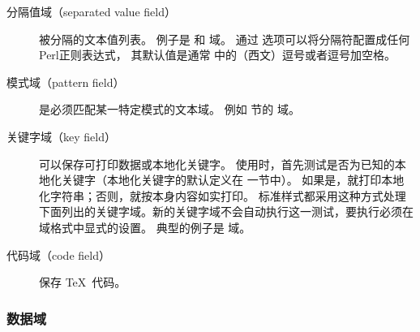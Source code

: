 \begin{description}
\begin{description}
\item[分隔值域（separated value field）]
被分隔的文本值列表。
例子是  和  域。
通过  选项可以将分隔符配置成任何Perl正则表达式，
其默认值是通常 \BibTeX 中的（西文）逗号或者逗号加空格。


\item[模式域（pattern field）] 是必须匹配某一特定模式的文本域。
例如  节的  域。



\item[关键字域（key field）] 可以保存可打印数据或本地化关键字。
使用时，首先测试是否为已知的本地化关键字（本地化关键字的默认定义在  一节中）。
如果是，就打印本地化字符串；否则，就按本身内容如实打印。
标准样式都采用这种方式处理下面列出的关键字域。新的关键字域不会自动执行这一测试，要执行必须在域格式中显式的设置。
典型的例子是  域。


\item[代码域（code field）] 保存 \TeX\ 代码。

\end{description}
\end{description}

\subsubsection{数据域}
\label{bib:fld:dat}


